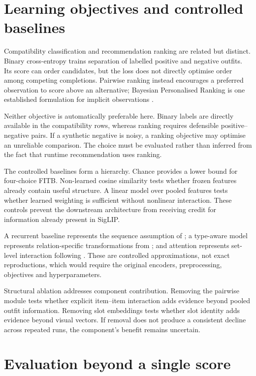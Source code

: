 \section{Learning objectives and controlled baselines}

Compatibility classification and recommendation ranking are related but
distinct. Binary cross-entropy trains separation of labelled positive and
negative outfits. Its score can order candidates, but the loss does not
directly optimise order among competing completions. Pairwise ranking instead
encourages a preferred observation to score above an alternative; Bayesian
Personalised Ranking is one established formulation for implicit observations
\parencite{rendle2009bpr}.

Neither objective is automatically preferable here. Binary labels are directly
available in the compatibility rows, whereas ranking requires defensible
positive--negative pairs. If a synthetic negative is noisy, a ranking objective
may optimise an unreliable comparison. The choice must be evaluated rather
than inferred from the fact that runtime recommendation uses ranking.

The controlled baselines form a hierarchy. Chance provides a lower bound for
four-choice FITB. Non-learned cosine similarity tests whether frozen features
already contain useful structure. A linear model over pooled features tests
whether learned weighting is sufficient without nonlinear interaction. These
controls prevent the downstream architecture from receiving credit for
information already present in SigLIP.

A recurrent baseline represents the sequence assumption of
\textcite{han2017bilstm}; a type-aware model represents relation-specific
transformations from \textcite{vasileva2018typeaware}; and attention represents
set-level interaction following \textcite{sarkar2023outfittransformer}. These
are controlled approximations, not exact reproductions, which would require the
original encoders, preprocessing, objectives and hyperparameters.

Structural ablation addresses component contribution. Removing the pairwise
module tests whether explicit item--item interaction adds evidence beyond
pooled outfit information. Removing slot embeddings tests whether slot identity
adds evidence beyond visual vectors. If removal does not produce a consistent
decline across repeated runs, the component's benefit remains uncertain.

\section{Evaluation beyond a single score}

